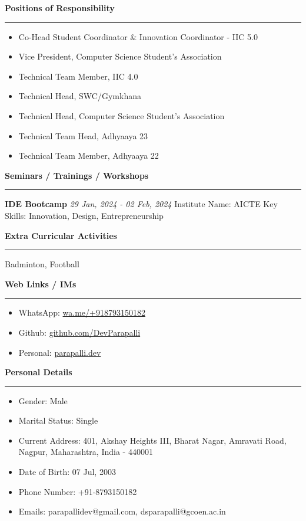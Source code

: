 \documentclass[a4paper,11pt]{article}
\renewcommand{\section}[1]{\vspace{0.5em}\textbf{\Large #1}\vspace{0.2em}\hrule\vspace{0.5em}}
\renewcommand{\subsection}[1]{\vspace{0.3em}\textbf{\large #1}\vspace{0.2em}}
\newcommand{\daterange}[2]{\textit{#1 - #2}}
\begin{document}
\section{Positions of Responsibility}
\begin{itemize}
    \item Co-Head Student Coordinator \& Innovation Coordinator - IIC 5.0
    \item Vice President, Computer Science Student's Association
    \item Technical Team Member, IIC 4.0
    \item Technical Head, SWC/Gymkhana
    \item Technical Head, Computer Science Student's Association
    \item Technical Team Head, Adhyaaya 23
    \item Technical Team Member, Adhyaaya 22
\end{itemize}

\section{Seminars / Trainings / Workshops}
\subsection{IDE Bootcamp}
\daterange{29 Jan, 2024}{02 Feb, 2024}
Institute Name: AICTE
Key Skills: Innovation, Design, Entrepreneurship

\section{Extra Curricular Activities}
Badminton, Football

\section{Web Links / IMs}
\begin{itemize}
    \item WhatsApp: \href{https://wa.me/+918793150182}{wa.me/+918793150182}
    \item Github: \href{https://github.com/DevParapalli}{github.com/DevParapalli}
    \item Personal: \href{https://parapalli.dev}{parapalli.dev}
\end{itemize}

\section{Personal Details}
\begin{itemize}
    \item Gender: Male
    \item Marital Status: Single
    \item Current Address: 401, Akshay Heights III, Bharat Nagar, Amravati Road, Nagpur, Maharashtra, India - 440001
    \item Date of Birth: 07 Jul, 2003
    \item Phone Number: +91-8793150182
    \item Emails: parapallidev@gmail.com, dsparapalli@gcoen.ac.in
\end{itemize}
\end{document}
